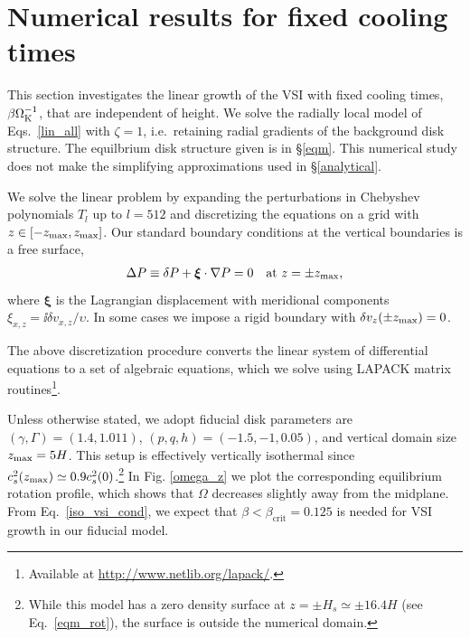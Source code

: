 \section{Numerical results for fixed cooling times}\label{numerical}
This section investigates the linear growth of the VSI with fixed
cooling times, $\beta\Omega_{\rm K}^{-1}$, that are independent of height.  
We solve the radially local model of Eqs.\ \ref{lin_all} with
$\zeta=1$, i.e.\ retaining  radial gradients of the background disk
structure. The equilbrium disk structure given is in \S\ref{eqm}. This
numerical study does not make the simplifying approximations  
used in \S\ref{analytical}. 

We solve the linear problem by expanding the 
perturbations in Chebyshev polynomials $T_l$ up to $l=512$
and discretizing the equations on a grid with
$z\in[-z_\mathrm{max},z_\mathrm{max}]$. Our standard boundary conditions at the vertical
boundaries is a free surface,  
\begin{align}
  \Delta P \equiv \delta P + \bm{\xi}\cdot\nabla P= 0 \quad \text{at } z=\pm z_\mathrm{max},
\end{align}
where $\bm{\xi}$ is the Lagrangian displacement with meridional 
components $\xi_{x,z} = \ii\delta v_{x,z}/\upsilon$. In some cases we
impose a rigid boundary with $\delta v_z(\pm z_\mathrm{max})=0$. 

The above discretization procedure
converts the linear system of differential equations to a set of 
algebraic equations,  which we solve using LAPACK matrix
routines\footnote{Available at \url{http://www.netlib.org/lapack/}.}.  

Unless otherwise stated, we adopt fiducial disk parameters are 
$(\gamma, \Gamma) = (1.4, 1.011)$, $(p,q, h)=(-1.5,-1,0.05)$, and 
vertical domain size $z_\mathrm{max}=5H$. This setup is effectively vertically
isothermal since $c_s^2(z_\mathrm{max}) \simeq 0.9c_s^2(0)$.\footnote{While this model
has a zero density surface at $z = \pm H_s \simeq \pm 16.4 H$ (see Eq.\ \ref{eqm_rot}), the surface is 
outside the numerical domain.} In Fig. \ref{omega_z}
we plot the corresponding equilibrium rotation profile, which shows
that $\Omega$ decreases slightly away from the midplane.   From Eq.\ \ref{iso_vsi_cond},
we expect that $\beta < \beta_\mathrm{crit} = 0.125$ is needed for VSI growth in our fiducial model. 

